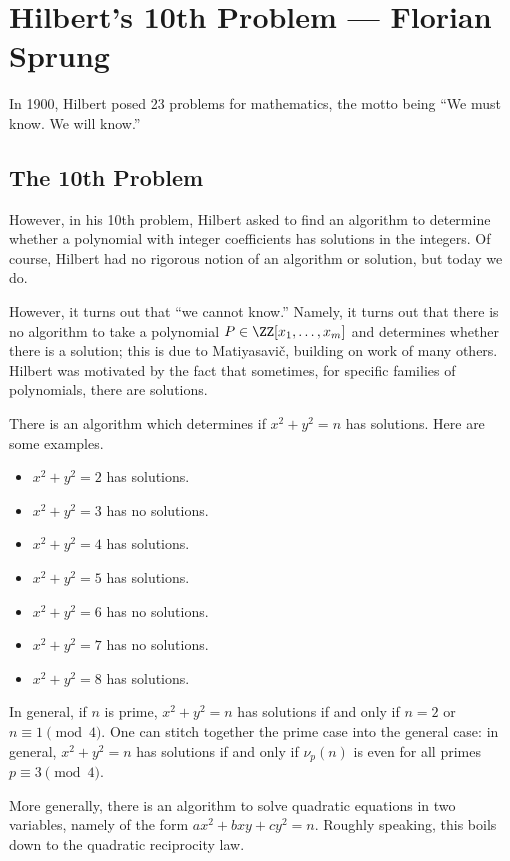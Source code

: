 \documentclass{article}
\begin{document}
\section{Hilbert's 10th Problem --- Florian Sprung}
In 1900, Hilbert posed 23 problems for mathematics, the motto being ``We must know. We will know.''

\subsection{The 10th Problem}
However, in his 10th problem, Hilbert asked to find an algorithm to determine whether a polynomial with integer coefficients has solutions in the integers. Of course, Hilbert had no rigorous notion of an algorithm or solution, but today we do.

However, it turns out that ``we cannot know.'' Namely, it turns out that there is no algorithm to take a polynomial $P\in\ZZ[x_1,\ldots,x_m]$ and determines whether there is a solution; this is due to Matiyasavi\v{c}, building on work of many others. Hilbert was motivated by the fact that sometimes, for specific families of polynomials, there are solutions.
\begin{example}
	There is an algorithm which determines if $x^2+y^2=n$ has solutions. Here are some examples.
	\begin{itemize}
		\item $x^2+y^2=2$ has solutions.
		\item $x^2+y^2=3$ has no solutions.
		\item $x^2+y^2=4$ has solutions.
		\item $x^2+y^2=5$ has solutions.
		\item $x^2+y^2=6$ has no solutions.
		\item $x^2+y^2=7$ has no solutions.
		\item $x^2+y^2=8$ has solutions.
	\end{itemize}
	In general, if $n$ is prime, $x^2+y^2=n$ has solutions if and only if $n=2$ or $n\equiv1\pmod4$. One can stitch together the prime case into the general case: in general, $x^2+y^2=n$ has solutions if and only if $\nu_p(n)$ is even for all primes $p\equiv3\pmod4$.
\end{example}
\begin{remark}
	More generally, there is an algorithm to solve quadratic equations in two variables, namely of the form $ax^2+bxy+cy^2=n$. Roughly speaking, this boils down to the quadratic reciprocity law.
\end{remark}
\end{document}
